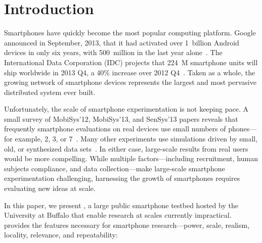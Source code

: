 \section{Introduction}
\label{sec-introduction}

Smartphones have quickly become the most popular computing platform. Google
announced in September, 2013, that it had activated over 1~billion Android
devices in only six years, with 500~million in the last year
alone~\cite{google-total-activations}. The International Data Corporation
(IDC) projects that 224~M smartphone units will ship worldwide in 2013 Q4, a
40\% increase over 2012 Q4~\cite{idc-smartphone-growth}. Taken as a whole,
the growing network of smartphone devices represents the largest and most
pervasive distributed system ever built.

Unfortunately, the scale of smartphone experimentation is not keeping pace. A
small survey of MobiSys'12, MobiSys'13, and SenSys'13 papers reveals that
frequently smartphone evaluations on real devices use small numbers of
phones---for example, 2, 3, or 7~\cite{nowar-mobisys12, wang:mobisys:2013,
hao:sensys:2013}. Many other experiments use simulations driven by small,
old, or synthesized data sets~\cite{falcon-mobisys12, ace-mobisys12,
humanmobility-mobisys12}. In either case, large-scale results from real users
would be more compelling. While multiple factors---including recruitment,
human subjects compliance, and data collection---make large-scale smartphone
experimentation challenging, harnessing the growth of smartphones requires
evaluating new ideas at scale.

\newpage

In this paper, we present \PhoneLab{}, a large public smartphone testbed
hosted by the University at Buffalo that enable research at scales currently
impractical. \PhoneLab{} provides the features necessary for smartphone
research---power, scale, realism, locality, relevance, and repeatability:

